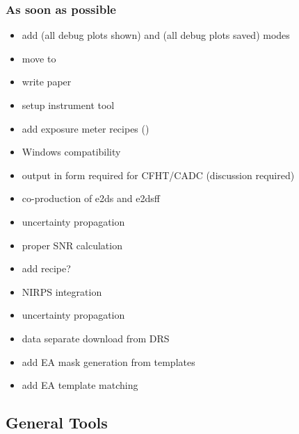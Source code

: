 \documentclass[a4paper,10pt,english]{report}
\begin{document}
\subsubsection{As soon as possible}
\label{\detokenize{user/general/todo:as-soon-as-possible}}\begin{itemize}
\item {} 
add  (all debug plots shown) and  (all debug plots saved) modes

\item {} 
move  to 

\item {} 
write  paper

\item {} 
setup instrument tool

\item {} 
add exposure meter recipes ()

\item {} 
Windows compatibility

\item {} 
output in form required for CFHT/CADC (discussion required)

\item {} 
co-production of e2ds and e2dsff

\item {} 
uncertainty propagation

\item {} 
proper SNR calculation

\item {} 
add  recipe?

\item {} 
NIRPS integration

\item {} 
uncertainty propagation

\item {} 
data separate download from DRS

\item {} 
add EA mask generation from templates

\item {} 
add EA template matching

\end{itemize}


\subsection{General Tools}
\label{\detokenize{user/general/tools_default:general-tools}}\label{\detokenize{user/general/tools_default:tools-default}}\label{\detokenize{user/general/tools_default::doc}}
\end{document}
